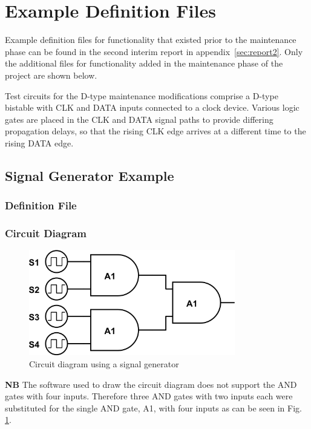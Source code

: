 \documentclass[a4paper,10pt]{article}
\begin{document}
\clearpage
\appendix

\section{Example Definition Files}
\label{sec:examples}
Example definition files for functionality that existed prior to the maintenance phase can be found in the second interim report in appendix~\ref{sec:report2}. Only the additional files for functionality added in the maintenance phase of the project are shown below. 

Test circuits for the D-type maintenance modifications comprise a D-type bistable with CLK and DATA inputs connected to a clock device. Various logic gates are placed in the CLK and DATA signal paths to provide differing propagation delays, so that the rising CLK edge arrives at a different time to the rising DATA edge. 

\subsection{Signal Generator Example}

\subsubsection{Definition File}


\clearpage
\subsubsection{Circuit Diagram}
\begin{figure}[h]
 \centering
 \includegraphics[width=9cm]{../../examples/siggen.png}
 \caption{Circuit diagram using a signal generator}
 \label{fig:example-siggen}
\end{figure}

\textbf{NB} The software used to draw the circuit diagram does not support the AND gates with four inputs. Therefore three AND gates with two inputs each were substituted for the single AND gate, A1, with four inputs as can be seen in Fig. \ref{fig:example-siggen}.
\end{document}
